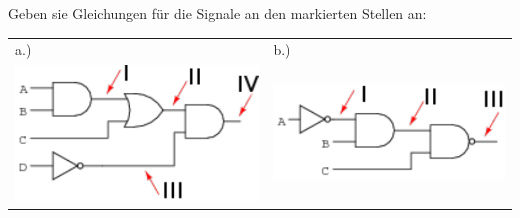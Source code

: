 \documentclass[a4paper,12pt]{article}
\begin{document}




\label{sec:gl}
Geben sie Gleichungen für die Signale an den markierten Stellen an:


\begin{center}
  \begin{tabular}{ll}
    a.) &b.)\\
    \includegraphics[width=.3\textwidth]{./images/01301x01_commented.pdf}&  \includegraphics[width=.3\textwidth]{./images/02783x01.pdf} 
  \end{tabular}

\end{center}

\end{document}
